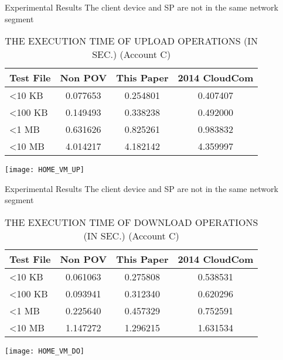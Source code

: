 \begin{frame}{Experimental Results}
{The client device and SP are \alert{not} in the same network segment}
	\scriptsize
	\begin{table}[]  
    \centering
    \caption{THE EXECUTION TIME OF \alert{UPLOAD} OPERATIONS (IN SEC.) (Account C)}
    \begin{tabular}{lccc}
        Test File        & Non POV  & This Paper & 2014 CloudCom \\ \hline
        \textless 10 KB  & 0.077653 & 0.254801   & 0.407407      \\ \hline
        \textless 100 KB & 0.149493 & 0.338238   & 0.492000      \\ \hline
        \textless 1 MB   & 0.631626 & 0.825261   & 0.983832      \\ \hline
        \textless 10 MB  & 4.014217 & 4.182142   & 4.359997      \\ \hline
    \end{tabular}
    \end{table}
	\begin{center}
	    \texttt{[image: HOME\_VM\_UP]}
    \end{center}
\end{frame}

\begin{frame}{Experimental Results}
{The client device and SP are \alert{not} in the same network segment}
	\scriptsize
    \begin{table}[]
    \centering
    \caption{THE EXECUTION TIME OF \alert{DOWNLOAD} OPERATIONS (IN SEC.) (Account C)}
    \begin{tabular}{lccc}
        Test File        & Non POV  & This Paper & 2014 CloudCom \\ \hline
        \textless 10 KB  & 0.061063 & 0.275808   & 0.538531      \\ \hline
        \textless 100 KB & 0.093941 & 0.312340   & 0.620296      \\ \hline
        \textless 1 MB   & 0.225640 & 0.457329   & 0.752591      \\ \hline
        \textless 10 MB  & 1.147272 & 1.296215   & 1.631534      \\ \hline
    \end{tabular}
    \end{table}
    \begin{center}
	    \texttt{[image: HOME\_VM\_DO]}
    \end{center}
\end{frame}

